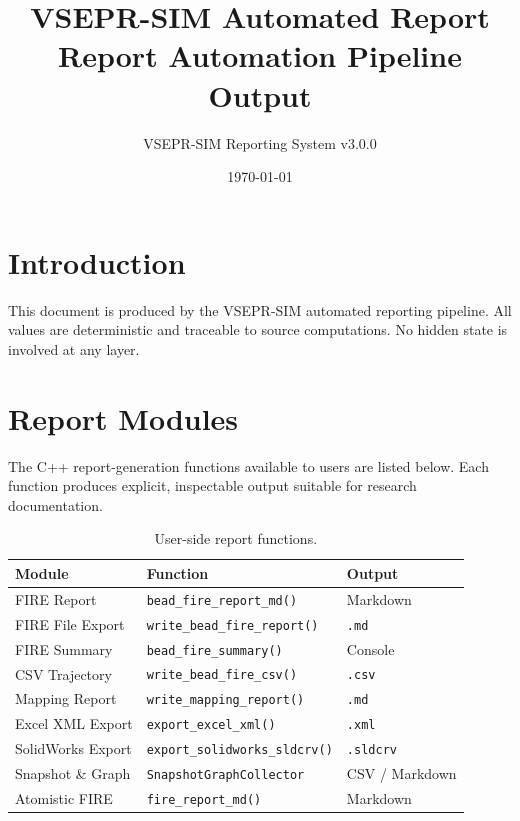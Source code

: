 \documentclass[11pt]{article}
\title{\textbf{VSEPR-SIM Automated Report} \\
\Large Report Automation Pipeline Output}
\author{VSEPR-SIM Reporting System v3.0.0}
\date{\today}
\begin{document}
\maketitle
\tableofcontents
\newpage

\section{Introduction}

This document is produced by the VSEPR-SIM automated reporting pipeline.
All values are deterministic and traceable to source computations.
No hidden state is involved at any layer.

\section{Report Modules}

The C++ report-generation functions available to users are listed below.
Each function produces explicit, inspectable output suitable for research
documentation.

\begin{table}[h]
\centering
\begin{tabular}{lll}
\toprule
\textbf{Module} & \textbf{Function} & \textbf{Output} \\
\midrule
FIRE Report         & \texttt{bead\_fire\_report\_md()}       & Markdown \\
FIRE File Export    & \texttt{write\_bead\_fire\_report()}     & \texttt{.md} \\
FIRE Summary        & \texttt{bead\_fire\_summary()}           & Console \\
CSV Trajectory      & \texttt{write\_bead\_fire\_csv()}        & \texttt{.csv} \\
Mapping Report      & \texttt{write\_mapping\_report()}        & \texttt{.md} \\
Excel XML Export    & \texttt{export\_excel\_xml()}            & \texttt{.xml} \\
SolidWorks Export   & \texttt{export\_solidworks\_sldcrv()}    & \texttt{.sldcrv} \\
Snapshot \& Graph   & \texttt{SnapshotGraphCollector}          & CSV / Markdown \\
Atomistic FIRE      & \texttt{fire\_report\_md()}              & Markdown \\
\bottomrule
\end{tabular}
\caption{User-side report functions.}
\end{table}
\end{document}
